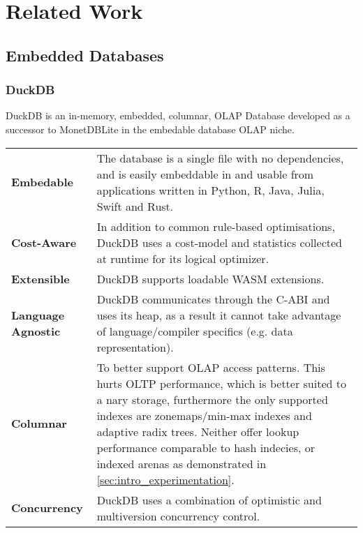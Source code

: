 \chapter{Related Work}
\section{Embedded Databases}
\subsection{DuckDB}
DuckDB is an in-memory, embedded, columnar, OLAP Database\cite{DuckDBPaper} developed as a successor to MonetDBLite\cite{MonetDBLitePaper} in the embedable database OLAP niche.
\begin{center}
    \begin{tabular}{l p{}}
        \textbf{Embedable}         & The database is a single file with no dependencies, and is easily embeddable in and usable from applications written in Python, R, Java, Julia, Swift and Rust\cite{DuckDBDocs}. \\
        \textbf{Cost-Aware}        & In addition to common rule-based optimisations, DuckDB uses a cost-model and statistics collected at runtime for its logical optimizer.                                          \\
        \textbf{Extensible}        & DuckDB supports loadable WASM extensions.                                                                                                                                        \\
        \textbf{Language Agnostic} & DuckDB communicates through the C-ABI and uses its heap, as a result it cannot take advantage of language/compiler specifics (e.g. data representation).                         \\
        \textbf{Columnar}          & To better support OLAP access patterns. This hurts OLTP performance, which is better suited to a nary storage, furthermore the only supported indexes are zonemaps/min-max
        indexes and adaptive radix trees. Neither offer lookup performance comparable to hash indecies, or indexed arenas as demonstrated in \ref{sec:intro_experimentation}.                                         \\
        \textbf{Concurrency}       & DuckDB uses a combination of optimistic and multiversion concurrency control.                                                                                                    \\
    \end{tabular}
\end{center}
\noindent
